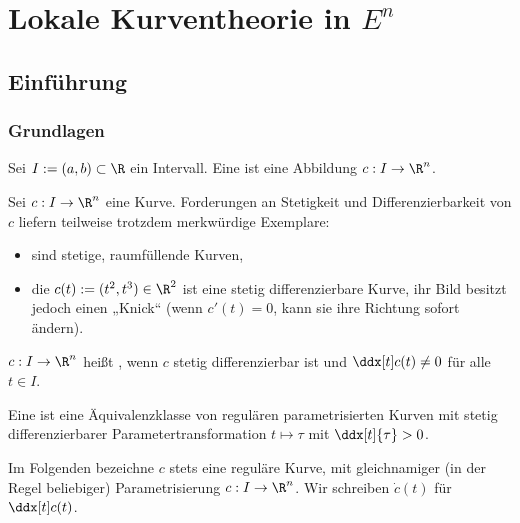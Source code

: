 \chapter{Lokale Kurventheorie in \texorpdfstring{$E^n$}{Eⁿ}}

\section{Einführung}

\subsection{Grundlagen}

\begin{df}
	Sei $I := (a, b) \subset \R$ ein Intervall.
	Eine  ist eine Abbildung $c: I \to \R^n$.
\end{df}

\begin{ex}
	Sei $c: I \to \R^n$ eine Kurve.
	Forderungen an Stetigkeit und Differenzierbarkeit von $c$ liefern teilweise trotzdem merkwürdige Exemplare:
	\begin{itemize}
		\item
			 sind stetige, raumfüllende Kurven,
		\item
			die  $c(t) := (t^2, t^3) \in \R^2$ ist eine stetig differenzierbare Kurve, ihr Bild besitzt jedoch einen „Knick“ (wenn $c'(t) = 0$, kann sie ihre Richtung sofort ändern).
	\end{itemize}
\end{ex}

\begin{df}
	$c: I \to \R^n$ heißt , wenn $c$ stetig differenzierbar ist und $\ddx[t] c(t) \neq 0$ für alle $t \in I$.

	Eine  ist eine Äquivalenzklasse von regulären parametrisierten Kurven mit stetig differenzierbarer Parametertransformation $t \mapsto \tau$ mit $\ddx[t]{\tau} > 0$.
\end{df}

\begin{conv}
	Im Folgenden bezeichne $c$ stets eine reguläre Kurve, mit gleichnamiger (in der Regel beliebiger) Parametrisierung $c: I \to \R^n$.
	Wir schreiben $\dot c(t)$ für $\ddx[t] c(t)$.
\end{conv}

